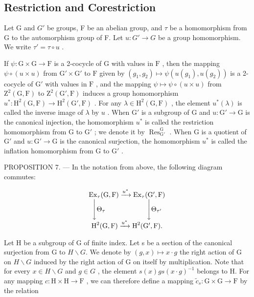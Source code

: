\subsection{Restriction and Corestriction}

Let G and \(G'\) be groups, F be an abelian group, and \(\tau\) be a homomorphism from G to the automorphism group of F. Let \(u: G' \to G\) be a group homomorphism. We write \(\tau' = \tau \circ u\) .

If \(\psi : \mathrm{G} \times \mathrm{G} \to \mathrm{F}\) is a 2-cocycle of \(\mathrm{G}\) with values in \(\mathrm{F}\) , then the mapping \(\psi \circ (u \times u)\) from \(\mathrm{G}' \times \mathrm{G}'\) to \(\mathrm{F}\) given by \((g_1, g_2) \mapsto \psi(u(g_1), u(g_2))\) is a 2-cocycle of \(\mathrm{G}'\) with values in \(\mathrm{F}\) , and the mapping \(\psi \mapsto \psi \circ (u \times u)\) from \(\mathrm{Z}^2(\mathrm{G}, \mathrm{F})\) to \(\mathrm{Z}^2(\mathrm{G}', \mathrm{F})\) induces a group homomorphism \(u^*: \mathrm{H}^2(\mathrm{G}, \mathrm{F}) \to \mathrm{H}^2(\mathrm{G}', \mathrm{F})\) . For any \(\lambda \in \mathrm{H}^2(\mathrm{G}, \mathrm{F})\) , the element \(u^*(\lambda)\) is called the inverse image of \(\lambda\) by \(u\) . When \(\mathrm{G}'\) is a subgroup of \(\mathrm{G}\) and \(u: \mathrm{G}' \to \mathrm{G}\) is the canonical injection, the homomorphism \(u^*\) is called the restriction homomorphism from \(\mathrm{G}\) to \(\mathrm{G}'\) ; we denote it by \(\operatorname{Res}_{\mathrm{G}'}^{\mathrm{G}}\) . When \(\mathrm{G}\) is a quotient of \(\mathrm{G}'\) and \(u: \mathrm{G}' \to \mathrm{G}\) is the canonical surjection, the homomorphism \(u^*\) is called the inflation homomorphism from \(\mathrm{G}\) to \(\mathrm{G}'\) .

PROPOSITION 7. --- In the notation from above, the following diagram commutes:

\[
\begin{array}{c} \operatorname{Ex} _ {\tau} (\mathrm{G}, \mathrm{F}) \xrightarrow {u ^ {*}} \operatorname{Ex} _ {\tau} (\mathrm{G} ^ {\prime}, \mathrm{F}) \\ \Biggl \downarrow \Theta_ {\tau} \qquad \qquad \qquad \Biggl \downarrow \Theta_ {\tau^ {\prime}} \\ \operatorname{H} ^ {2} (\mathrm{G}, \mathrm{F}) \xrightarrow {u ^ {*}} \operatorname{H} ^ {2} (\mathrm{G} ^ {\prime}, \mathrm{F})  . \end{array}
\]

Let H be a subgroup of G of finite index. Let s be a section of the canonical surjection from G to \(H\backslash G\). We denote by \((g,x)\mapsto x\cdot g\) the right action of G on \(H\backslash G\) induced by the right action of G on itself by multiplication. Note that for every \(x\in H\backslash G\) and \(g\in G\) , the element \(s(x)gs(x\cdot g)^{-1}\) belongs to H. For any mapping \(c: \mathrm{H} \times \mathrm{H} \to \mathrm{F}\) , we can therefore define a mapping \(\widetilde{c}_s: \mathrm{G} \times \mathrm{G} \to \mathrm{F}\) by the relation

